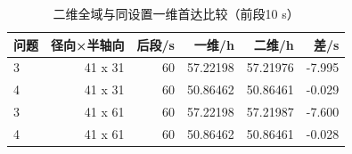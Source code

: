 \begin{table}[!htbp]\centering
\small
\caption{二维全域与同设置一维首达比较（前段10 s）}
\begin{tabular}{lrrrrr}\toprule
问题 & 径向×半轴向 & 后段/s & 一维/h & 二维/h & 差/s\\\midrule
3 & 41 x 31 & 60 & 57.22198 & 57.21976 & -7.995\\
4 & 41 x 31 & 60 & 50.86462 & 50.86461 & -0.029\\
3 & 41 x 61 & 60 & 57.22198 & 57.21987 & -7.600\\
4 & 41 x 61 & 60 & 50.86462 & 50.86461 & -0.028\\
\bottomrule\end{tabular}\end{table}
